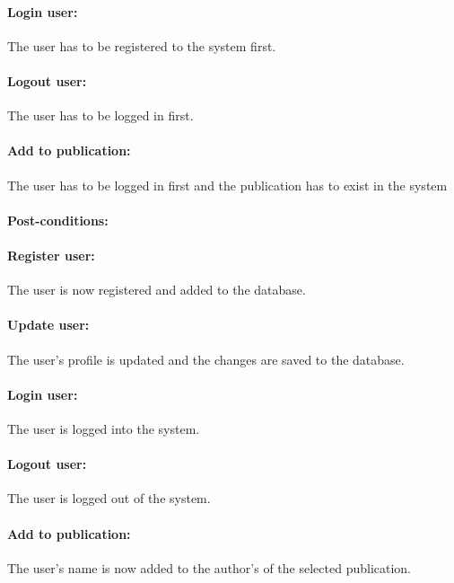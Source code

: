 \documentclass{article}
\begin{document}
				\paragraph{Login user:} The user has to be registered to the system first.
				\paragraph{Logout user:} The user has to be logged in first.
				\paragraph{Add to publication:} The user has to be logged in first and the publication has to exist in the system
				\paragraph{Post-conditions:}
				\paragraph{Register user:} The user is now registered and added to the database.
				\paragraph{Update user:} The user's profile is updated and the changes are saved to the database.
				\paragraph{Login user:} The user is logged into the system.
				\paragraph{Logout user:} The user is logged out of the system.
				\paragraph{Add to publication:} The user's name is now added to the author's of the selected publication.
\end{document}
